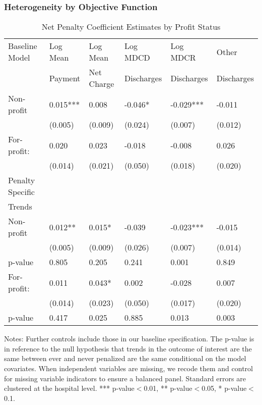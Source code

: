 \documentclass{beamer}
\begin{document}
\begin{frame}
\frametitle{Heterogeneity by Objective Function}
\begin{table}[htp]
\centering \normalsize
\caption{Net Penalty Coefficient Estimates by Profit Status}
\scriptsize
\begin{tabular}{llllll}
\hline	\hline
Baseline Model	& Log Mean 		& Log Mean	   & Log MDCD 	   	& Log MDCR   		& Other  			\\
		& Payment		& Net Charge	& Discharges      & Discharges       & Discharges    \\	
\hline
Non-profit & 0.015*** & 0.008 & -0.046* & -0.029*** & -0.011  \\
 & (0.005) & (0.009) & (0.024) & (0.007) & (0.012)  \\
\hline
For-profit:  & 0.020 & 0.023 & -0.018 & -0.008 & 0.026 \\
 & (0.014) & (0.021) & (0.050) & (0.018) & (0.020)  \\
\hline \hline
Penalty Specific & & & & & \\
Trends & & & & & \\
\hline
Non-profit & 0.012** & 0.015* & -0.039 & -0.023*** & -0.015  \\
 & (0.005) & (0.009) & (0.026) & (0.007) & (0.014)  \\
p-value & 0.805 & 0.205 & 0.241 & 0.001 & 0.849  \\
\hline
For-profit:  & 0.011 & 0.043* & 0.002 & -0.028 & 0.007  \\
 & (0.014) & (0.023) & (0.050) & (0.017) & (0.020)  \\
 p-value & 0.417 & 0.025 & 0.885 & 0.013 & 0.003  \\
\hline 
\end{tabular}
\end{table}
\tiny Notes: Further controls include those in our baseline speciﬁcation. The p-value is in reference to the null hypothesis that trends in the outcome of interest are the same between ever and never penalized are the same conditional on the model covariates. When independent variables are missing, we recode them and control for missing variable indicators to ensure a balanced panel. Standard errors are clustered at the hospital level. *** p-value$<$0.01, ** p-value$<$0.05, * p-value$<$0.1.
\end{frame}
\end{document}
